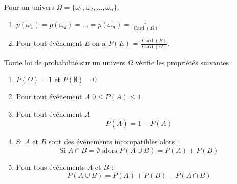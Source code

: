 \documentclass[main.tex]{subfiles}
\begin{document}
\begin{definition} Pour un univers $\Omega=\{ \omega_1, \omega_2, \ldots , \omega_n\}$.
	\begin{enumerate}[label=\alph*),leftmargin=*] 
		\item   
		$
		p(\omega_1)=p(\omega_2) =\ldots=p(\omega_n)=\frac{1}{\operatorname{Card}(\Omega)}
		$      
		\item Pour tout événement $E$ on a $P(E)=\frac{\operatorname{Card}(E)}{\operatorname{Card}(\Omega)}$.
	\end{enumerate}	 
\end{definition}
\begin{theorem}[formulaire]
	Toute loi de probabilité sur un univers $\Omega$ vérifie les propriétés suivantes :
	\begin{enumerate}[label={\textbf{(P\arabic*)}},leftmargin=*]
		\item $P(\Omega)=1$ et $P(\emptyset)=0$
		\item Pour tout événement $A$ \hfill  $0\leqslant P(A)\leqslant 1$ 
		\item {}  Pour tout événement $A$  \hfill    $$P(\overline{A})=1-P(A)$$  
		\item  Si $A$ et $B$ sont des événements incompatibles  alors :
		$$\text{Si $A\cap B=\emptyset$ alors } P(A\cup B)=P(A)+P(B)$$
		\item  Pour tous événements $A$ et $B$ :  
		$$ 
		P( A\cup B)   =  P(A)+P(B) -P(A\cap B)
		$$
	\end{enumerate}
\end{theorem}
\end{document}
